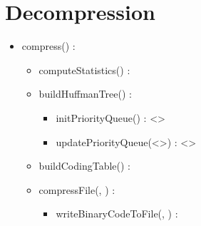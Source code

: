 \section{Decompression}


\begin{itemize}
    \item compress(\binaryFile) : \binaryFile
    \begin{itemize}
        \item computeStatistics(\binaryFile) : \statistics
        \item buildHuffmanTree(\statistics) : \huffmanTree
        \begin{itemize}
            \item initPriorityQueue(\statistics) : \priorityQueue<\huffmanTree>
            \item updatePriorityQueue(\priorityQueue<\huffmanTree>) : \priorityQueue<\huffmanTree>
        \end{itemize}
        \item buildCodingTable(\huffmanTree) : \codingTable
        \item compressFile(\binaryFile, \codingTable) : \binaryFile
        \begin{itemize}
            \item writeBinaryCodeToFile(\binaryFile, \binaryCode) : \binaryFile
        \end{itemize}
    \end{itemize}
\end{itemize}